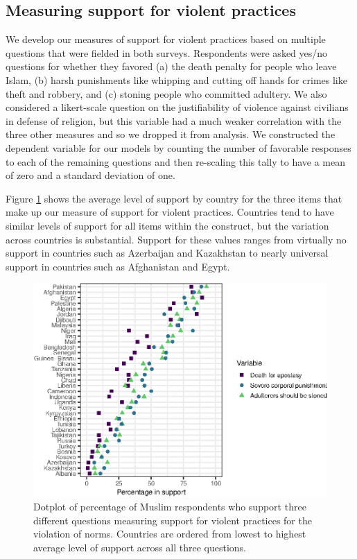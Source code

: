 \documentclass[10pt,letterpaper]{article}
\begin{document}
\subsection*{Measuring support for violent practices}

We develop our measures of support for violent practices based on multiple questions that were fielded in both surveys. Respondents were asked yes/no questions for whether they favored (a) the death penalty for people who leave Islam, (b) harsh punishments like whipping and cutting off hands for crimes like theft and robbery, and (c) stoning people who committed adultery. We also considered a likert-scale question on the justifiability of violence against civilians in defense of religion, but this variable had a much weaker correlation with the three other measures and so we dropped it from analysis. We constructed the dependent variable for our models by counting the number of favorable responses to each of the remaining questions and then re-scaling this tally to have a mean of zero and a standard deviation of one.

Figure \ref{fig:country-averages} shows the average level of support by country for the three items that make up our measure of support for violent practices. Countries tend to have similar levels of support for all items within the construct, but the variation across countries is substantial. Support for these values ranges from virtually no support in countries such as Azerbaijan and Kazakhstan to nearly universal support in countries such as Afghanistan and Egypt.

\begin{figure}[!h]
\centering
\includegraphics{figures/fig2.eps}
\caption{Dotplot of percentage of Muslim respondents who support three different questions measuring support for violent practices for the violation of norms. Countries are ordered from lowest to highest average level of support across all three questions.}
\label{fig:country-averages}
\end{figure}
\end{document}
